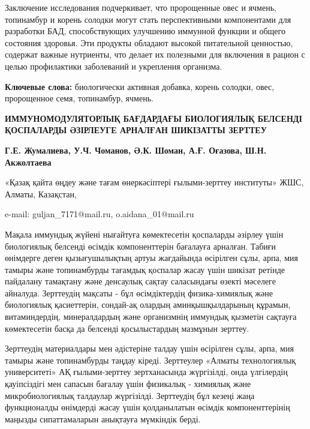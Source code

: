 Заключение исследования подчеркивает, что пророщенные овес и ячмень,
топинамбур и корень солодки могут стать перспективными компонентами для
разработки БАД, способствующих улучшению иммунной функции и общего
состояния здоровья. Эти продукты обладают высокой питательной ценностью,
содержат важные нутриенты, что делает их полезными для включения в
рацион с целью профилактики заболеваний и укрепления организма.

{\bfseries Ключевые слова:} биологически активная добавка, корень солодки,
овес, пророщенное семя, топинамбур, ячмень.

\begin{articleheader}
{\bfseries ИММУНОМОДУЛЯТОРЛЫҚ БАҒДАРДАҒЫ БИОЛОГИЯЛЫҚ БЕЛСЕНДІ ҚОСПАЛАРДЫ ӘЗІРЛЕУГЕ АРНАЛҒАН ШИКІЗАТТЫ ЗЕРТТЕУ}

{\bfseries
Г.Е. Жумалиева\textsuperscript{\envelope },
У.Ч. Чоманов,
Ә.К. Шоман,
А.Ғ. Оғазова\textsuperscript{\envelope },
Ш.Н. Акжолтаева
}
\end{articleheader}

\begin{affiliation}
«Қазақ қайта өңдеу және тағам өнеркәсіптері ғылыми-зерттеу институты» ЖШС, Алматы, Казақстан,

e-mail: guljan\_7171@mail.ru, o.aidana\_01@mail.ru
\end{affiliation}

Мақала иммундық жүйені нығайтуға көмектесетін қоспаларды әзірлеу үшін
биологиялық белсенді өсімдік компоненттерін бағалауға арналған. Табиғи
өнімдерге деген қызығушылықтың артуы жағдайында өсірілген сұлы, арпа,
мия тамыры және топинамбурды тағамдық қоспалар жасау үшін шикізат
ретінде пайдалану тамақтану және денсаулық сақтау саласындағы өзекті
мәселеге айналуда. Зерттеудің мақсаты - бұл өсімдіктердің
физика-химиялық және биологиялық қасиеттерін, сондай-ақ олардың
аминқышқылдарының құрамын, витаминдердің, минералдардың және организмнің
иммундық қызметін сақтауға көмектесетін басқа да белсенді қосылыстардың
мазмұнын зерттеу.

Зерттеудің материалдары мен әдістеріне талдау үшін өсірілген сұлы, арпа,
мия тамыры және топинамбурды таңдау кіреді. Зерттеулер «Алматы
технологиялық университеті» АҚ ғылыми-зерттеу зертханасында жүргізілді,
онда үлгілердің қауіпсіздігі мен сапасын бағалау үшін физикалық - химиялық
және микробиологиялық талдаулар жүргізілді. Зерттеудің бұл кезеңі жаңа
функционалды өнімдерді жасау үшін қолданылатын өсімдік компоненттерінің
маңызды сипаттамаларын анықтауға мүмкіндік берді.

